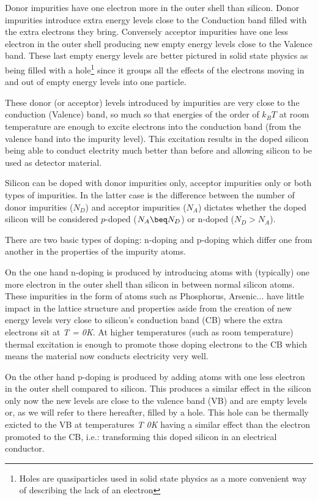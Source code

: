 Donor impurities have one electron more in the outer shell than silicon. Donor impurities introduce extra energy levels close to the Conduction band filled with the extra electrons they bring. Conversely acceptor impurities have one less electron in the outer shell producing new empty energy levels close to the Valence band. These last empty energy levels are better pictured in solid state physics as being filled with a hole\footnote{Holes are quasiparticles used in solid state physics as a more convenient way of describing the lack of an electron} since it groups all the effects of the electrons moving in and out of empty energy levels into one particle.

These donor (or acceptor) levels introduced by impurities are very close to the conduction (Valence) band, so much so that energies of the order of $k_B T$ at room temperature are enough to excite electrons into the conduction band (from the valence band into the impurity level). This excitation results in the doped silicon being able to conduct electrity much better than before and allowing silicon to be used as detector material.

Silicon can be doped with donor impurities only, acceptor impurities only or both types of impurities. In the latter case is the difference between the number of donor impurities ($N_D$) and acceptor impurities ($N_A$) dictates whether the doped silicon will be considered $p$-doped ($N_A \beq N_D $) or n-doped ($N_D > N_A$).



There are two basic types of doping: n-doping and p-doping which differ one from another in the properties of the impurity atoms.

On the one hand n-doping is produced by introducing atoms with (typically) one more electron in the outer shell than silicon in between normal silicon atoms. These impurities in the form of atoms such as Phosphorus, Arsenic... have little impact in the lattice structure and properties aside from the creation of new energy levels very close to silicon’s conduction band (CB) where the extra electrons sit at \textit{T = 0K}. At higher temperatures (such as room temperature) thermal excitation is enough to promote those doping electrons to the CB which means the material now conducts electricity very well.

On the other hand p-doping is produced by adding atoms with one less electron in the outer shell compared to silicon. This produces a similar effect in the silicon only now the new levels are close to the valence band (VB) and are empty levels or, as we will refer to there hereafter, filled by a hole. This hole can be thermally exicted to the VB at temperatures \textit{T \beq 0K} having a similar effect than the electron promoted to the CB, i.e.: transforming this doped silicon in an electrical conductor.

